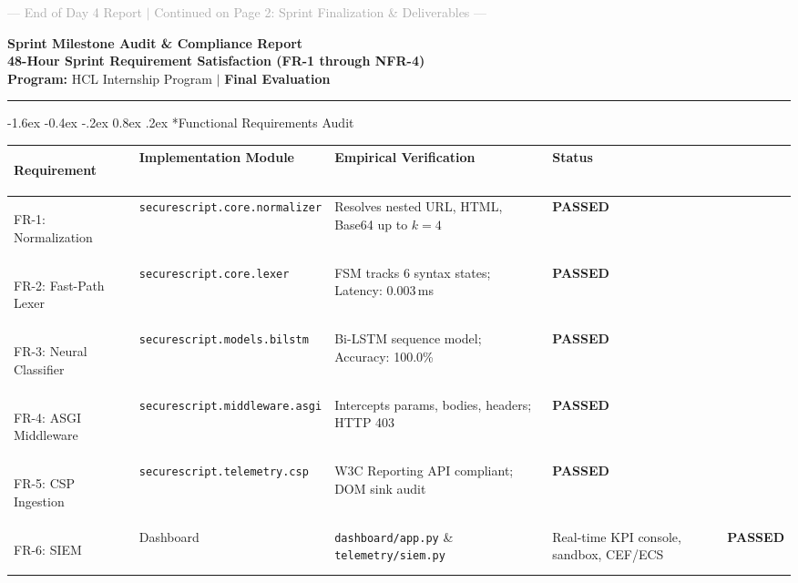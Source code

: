 \documentclass[11pt,a4paper]{article}
\makeatletter
\renewcommand{\section}{\@startsection{section}{1}{\z@}%
  {-1.6ex \@plus -0.4ex \@minus -.2ex}%
  {0.8ex \@plus .2ex}%
  {\normalfont\large\bfseries\color{primaryblue}}}
\makeatother
\begin{document}
\vfill
\begin{center}
\footnotesize \textcolor{darkgray}{--- End of Day 4 Report $\vert$ Continued on Page 2: Sprint Finalization & Deliverables ---}
\end{center}

\newpage

\begin{center}
    {\LARGE \textbf{\color{primaryblue} Sprint Milestone Audit \& Compliance Report}} \\[0.25em]
    {\large \textbf{48-Hour Sprint Requirement Satisfaction (FR-1 through NFR-4)}} \\[0.2em]
    {\footnotesize \textbf{Program:} HCL Internship Program \quad $\vert$ \quad \textbf{Final Evaluation}}
\end{center}

\vspace{0.3em}
\hrule height 1pt
\vspace{0.8em}

\section*{Functional Requirements Audit}
\begin{table}[htbp]
\centering
\footnotesize
\begin{tabularx}{\textwidth}{>{\bfseries\raggedright\arraybackslash}p{2.6cm} >{\raggedright\arraybackslash}p{4.2cm} >{\raggedright\arraybackslash}X >{\centering\arraybackslash}p{1.8cm}}
\toprule
\textbf{Requirement} & \textbf{Implementation Module} & \textbf{Empirical Verification} & \textbf{Status} \\
\midrule
FR-1: Normalization & \texttt{securescript.core.normalizer} & Resolves nested URL, HTML, Base64 up to $k=4$ & \textbf{PASSED} \\
\addlinespace
FR-2: Fast-Path Lexer & \texttt{securescript.core.lexer} & FSM tracks 6 syntax states; Latency: 0.003\,ms & \textbf{PASSED} \\
\addlinespace
FR-3: Neural Classifier & \texttt{securescript.models.bilstm} & Bi-LSTM sequence model; Accuracy: 100.0\% & \textbf{PASSED} \\
\addlinespace
FR-4: ASGI Middleware & \texttt{securescript.middleware.asgi} & Intercepts params, bodies, headers; HTTP 403 & \textbf{PASSED} \\
\addlinespace
FR-5: CSP Ingestion & \texttt{securescript.telemetry.csp} & W3C Reporting API compliant; DOM sink audit & \textbf{PASSED} \\
\addlinespace
FR-6: SIEM & Dashboard & \texttt{dashboard/app.py} \& \texttt{telemetry/siem.py} & Real-time KPI console, sandbox, CEF/ECS & \textbf{PASSED} \\
\bottomrule
\end{tabularx}
\end{table}
\end{document}
